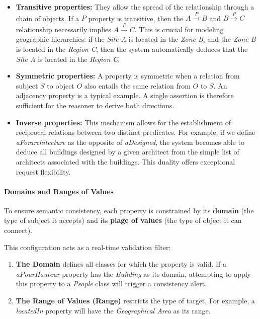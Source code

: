 \documentclass{article}
\begin{document}
\begin{itemize}
\item \textbf{Transitive properties:} They allow the spread of the relationship through a chain of objects. If a $P$ property is transitive, then the $A \xrightarrow{P} B$ and $B \xrightarrow{P} C$ relationship necessarily implies $A \xrightarrow{P} C$. This is crucial for modeling geographic hierarchies: if the \textit{Site A} is located in the \textit{Zone B}, and the \textit{Zone B} is located in the \textit{Region C}, then the system automatically deduces that the \textit{Site A} is located in the \textit{Region C}.
    
\item \textbf{Symmetric properties:} A property is symmetric when a relation from subject $S$ to object $O$ also entails the same relation from $O$ to $S$. An adjacency property is a typical example. A single assertion is therefore sufficient for the reasoner to derive both directions.

\item \textbf{Inverse properties:} This mechanism allows for the establishment of reciprocal relations between two distinct predicates. For example, if we define \textit{aForarchitecture} as the opposite of \textit{aDesigned}, the system becomes able to deduce all buildings designed by a given architect from the simple list of architects associated with the buildings. This duality offers exceptional request flexibility.
\end{itemize}



\paragraph{Domains and Ranges of Values }
To ensure semantic consistency, each property is constrained by its \textbf{domain} (the type of subject it accepts) and its \textbf{plage of values} (the type of object it can connect).

This configuration acts as a real-time validation filter:
\begin{enumerate}
\item \textbf {The Domain} defines all classes for which the property is valid. If a \textit{aPourHauteur} property has the \textit{Building} as its domain, attempting to apply this property to a \textit{People} class will trigger a consistency alert.
\item \textbf {The Range of Values (Range)} restricts the type of target. For example, a \textit{locatedIn} property will have the \textit{Geographical Area} as its range.
\end{enumerate}
\end{document}
